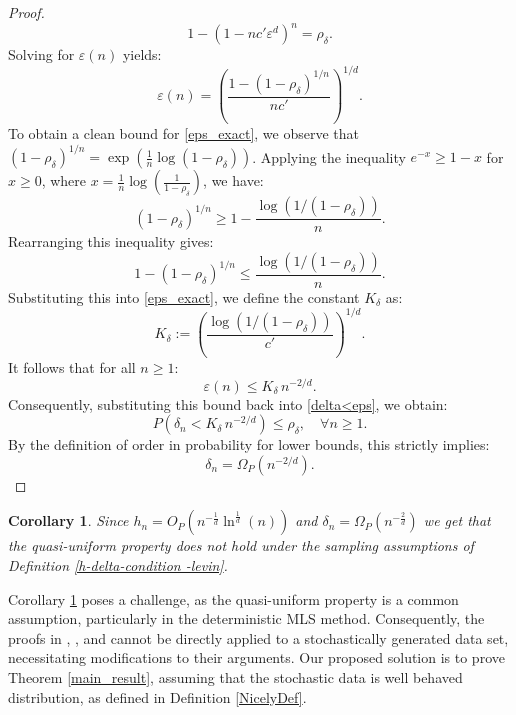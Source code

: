 \documentclass{article}
\newtheorem{coro}{Corollary}
\begin{document}
\begin{proof}
\begin{equation}
    1 - (1 - n c' \varepsilon^d)^n = \rho_\delta.
\end{equation}
Solving for $\varepsilon(n)$ yields:
\begin{equation}
    \varepsilon(n) = \left( \frac{1 - (1 - \rho_\delta)^{1/n}}{n c'} \right)^{1/d}.
    \label{eps_exact}
\end{equation}
To obtain a clean bound for \eqref{eps_exact}, we observe that $(1 - \rho_\delta)^{1/n} = \exp\left( \frac{1}{n} \log(1 - \rho_\delta) \right)$. Applying the inequality $e^{-x} \geq 1 - x$ for $x \geq 0$, where $x = \frac{1}{n} \log\left(\frac{1}{1 - \rho_\delta}\right)$, we have:
\begin{equation}
    (1 - \rho_\delta)^{1/n} \geq 1 - \frac{\log(1 / (1 - \rho_\delta))}{n}.
\end{equation}
Rearranging this inequality gives:
\begin{equation}
    1 - (1 - \rho_\delta)^{1/n} \leq \frac{\log(1 / (1 - \rho_\delta))}{n}.
\end{equation}
Substituting this into \eqref{eps_exact}, we define the constant $K_\delta$ as:
\begin{equation}
    K_\delta := \left( \frac{\log(1 / (1 - \rho_\delta))}{c'} \right)^{1/d}.
\end{equation}
It follows that for all $n \geq 1$:
\begin{equation}
    \varepsilon(n) \leq K_\delta \, n^{-2/d}.
\end{equation}
Consequently, substituting this bound back into \eqref{delta<eps}, we obtain:
\begin{equation}
    P\left( \delta_n < K_\delta \, n^{-2/d} \right) \leq \rho_\delta, \quad \forall n \geq 1.
\end{equation}
By the definition of order in probability for lower bounds, this strictly implies:
\begin{equation}
    \delta_n = \Omega_P(n^{-2/d}).
\end{equation}

\end{proof}

\begin{coro}
    Since $h_n = O_P(n^{-\frac{1}{d}} \ln ^{\frac{1}{d}}(n))$ and $\delta_n = \Omega_P(n^{-\frac{2}{d}})$ we get that the quasi-uniform property does not hold under the sampling assumptions of Definition \ref{h-delta-condition -levin}.
    \label{Failure of Quasi-corollary}
\end{coro}
Corollary \ref{Failure of Quasi-corollary} poses a challenge, as the quasi-uniform property is a common assumption, particularly in the deterministic MLS method. Consequently, the proofs in \cite{levin1998approximation}, \cite{mirzaei2015analysis}, and \cite{wendland2005scattered} cannot be directly applied to a stochastically generated data set, necessitating modifications to their arguments.
Our proposed solution is to prove Theorem \ref{main_result}, assuming that the stochastic data is well behaved distribution, as defined in Definition \ref{NicelyDef}.
\end{document}
